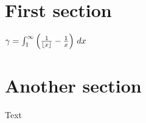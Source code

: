 \documentclass[a4paper,10pt]{article}
\begin{document}
\tableofcontents
\bigskip
\section{First section}
$\gamma = \int_1^\infty\left({1\over\lfloor x\rfloor}
-{1\over x}\right)\,dx$
 
\printnomenclature
 
\section{Another section}
Text
\end{document}
